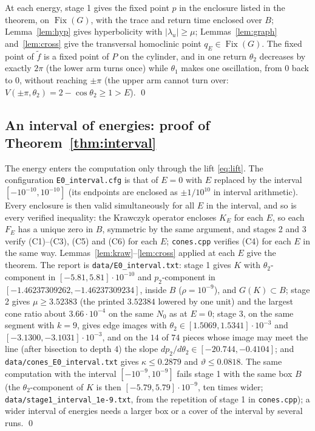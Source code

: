 \documentclass[11pt]{article}
\theoremstyle{definition}
\newcommand{\Fix}{\operatorname{Fix}}
\newcommand{\tf}{\tilde f}
\begin{document}
At each energy, stage 1 gives the fixed point $p$ in the enclosure listed in the theorem, on $\Fix(G)$, with the trace and return time enclosed over $B$; Lemma~\ref{lem:hyp} gives hyperbolicity with $|\lambda_u| \ge \mu$; Lemmas~\ref{lem:graph} and~\ref{lem:cross} give the transversal homoclinic point $q_E \in \Fix(G)$. The fixed point of $\tf$ is a fixed point of $P$ on the cylinder, and in one return $\theta_2$ decreases by exactly $2\pi$ (the lower arm turns once) while $\theta_1$ makes one oscillation, from $0$ back to $0$, without reaching $\pm\pi$ (the upper arm cannot turn over: $V(\pm\pi, \theta_2) = 2 - \cos\theta_2 \ge 1 > E$). \qed

\subsection{An interval of energies: proof of Theorem~\ref{thm:interval}}\label{sec:interval}

The energy enters the computation only through the lift \eqref{eq:lift}. The configuration \texttt{E0\_interval.cfg} is that of $E = 0$ with $E$ replaced by the interval $[-10^{-10}, 10^{-10}]$ (its endpoints are enclosed as $\pm1/10^{10}$ in interval arithmetic). Every enclosure is then valid simultaneously for all $E$ in the interval, and so is every verified inequality: the Krawczyk operator encloses $K_E$ for each $E$, so each $F_E$ has a unique zero in $B$, symmetric by the same argument, and stages 2 and 3 verify (C1)--(C3), (C5) and (C6) for each $E$; \texttt{cones.cpp} verifies (C4) for each $E$ in the same way. Lemmas~\ref{lem:kraw}--\ref{lem:cross} applied at each $E$ give the theorem. The report is \texttt{data/E0\_interval.txt}: stage 1 gives $K$ with $\theta_2$-component in $[-5.81, 5.81]\cdot10^{-10}$ and $p_2$-component in $[-1.46237309262, -1.46237309234]$, inside $B$ ($\rho = 10^{-9}$), and $G(K) \subset B$; stage 2 gives $\mu \ge 3.52383$ (the printed $3.52384$ lowered by one unit) and the largest cone ratio about $3.66\cdot10^{-4}$ on the same $N_0$ as at $E = 0$; stage 3, on the same segment with $k = 9$, gives edge images with $\theta_2 \in [1.5069, 1.5341]\cdot10^{-3}$ and $[-3.1300, -3.1031]\cdot10^{-3}$, and on the $14$ of $74$ pieces whose image may meet the line (after bisection to depth $4$) the slope $dp_2/d\theta_2 \in [-20.744, -0.4104]$; and \texttt{data/cones\_E0\_interval.txt} gives $\kappa \le 0.2879$ and $\vartheta \le 0.0818$. The same computation with the interval $[-10^{-9}, 10^{-9}]$ fails stage 1 with the same box $B$ (the $\theta_2$-component of $K$ is then $[-5.79, 5.79]\cdot10^{-9}$, ten times wider; \texttt{data/stage1\_interval\_1e-9.txt}, from the repetition of stage 1 in \texttt{cones.cpp}); a wider interval of energies needs a larger box or a cover of the interval by several runs. \qed
\end{document}
